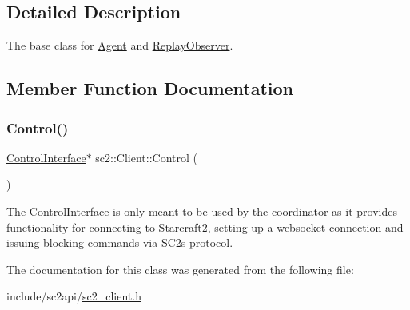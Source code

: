 \subsection{Detailed Description}
The base class for \hyperlink{classsc2_1_1_agent}{Agent} and \hyperlink{classsc2_1_1_replay_observer}{Replay\+Observer}. 

\subsection{Member Function Documentation}
\mbox{\label{classsc2_1_1_client_a741b9dd091f11694dd814c9b01f86dd8}} 
\subsubsection{\texorpdfstring{Control()}{Control()}}
{\footnotesize\ttfamily \hyperlink{classsc2_1_1_control_interface}{Control\+Interface}$\ast$ sc2\+::\+Client\+::\+Control (\begin{DoxyParamCaption}{ }\end{DoxyParamCaption})}

The \hyperlink{classsc2_1_1_control_interface}{Control\+Interface} is only meant to be used by the coordinator as it provides functionality for connecting to Starcraft2, setting up a websocket connection and issuing blocking commands via S\+C2\textquotesingle{}s protocol. 

The documentation for this class was generated from the following file\+:\begin{DoxyCompactItemize}
\item 
include/sc2api/\hyperlink{sc2__client_8h}{sc2\+\_\+client.\+h}\end{DoxyCompactItemize}
